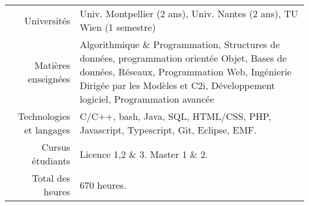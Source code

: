 
\begin{tabular}{r @{~$\rangle$~} p{}}

Universités & Univ. Montpellier (2 ans), Univ. Nantes (2 ans), TU Wien (1 semestre) \\

Matières enseignées & Algorithmique \& Programmation, Structures de données, programmation orientée Objet, Bases de données, Réseaux, Programmation Web, Ingénierie Dirigée par les Modèles et C2i, Développement logiciel, Programmation avancée  \\

Technologies et langages & C/C++, bash, Java, SQL, HTML/CSS, PHP, Javascript, Typescript, Git, Eclipse, EMF.\\

Cursus étudiants & Licence 1,2 \& 3. Master 1 \& 2. \\

Total des heures & $670$ heures. \\
\end{tabular}
